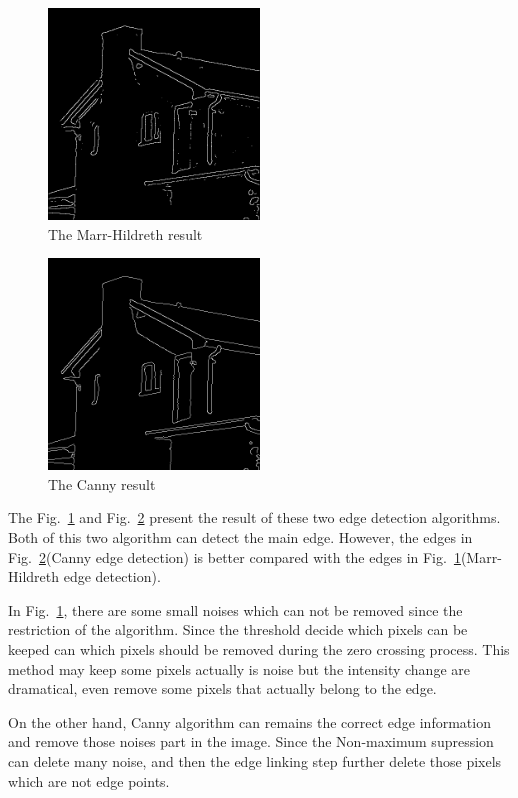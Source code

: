 \documentclass[12pt]{article}
\begin{document}
\begin{enumerate}[leftmargin=\labelsep]
\begin{enumerate}
        \begin{figure}[H]
            \centering
            \includegraphics[width=0.5\textwidth,height=0.5\textwidth]{Figure/marrHildreth.png}
            \caption{The Marr-Hildreth result}
            \label{Q4_1}
        \end{figure}
        
        \begin{figure}[H]
            \centering
            \includegraphics[width=0.5\textwidth,height=0.5\textwidth]{Figure/Canny.png}
            \caption{The Canny result}
            \label{Q4_2}
        \end{figure}

        The Fig.~\ref{Q4_1} and Fig.~\ref{Q4_2} present the result of these two edge detection algorithms. 
        Both of this two algorithm can detect the main edge.
        However, the edges in Fig.~\ref{Q4_2}(Canny edge detection) is better compared with the edges in Fig.~\ref{Q4_1}(Marr-Hildreth edge detection). 

        In Fig.~\ref{Q4_1}, there are some small noises which can not be removed since the restriction of the algorithm. 
        Since the threshold decide which pixels can be keeped can which pixels should be removed during the zero crossing process.
        This method may keep some pixels actually is noise but the intensity change are dramatical, even remove some pixels that actually belong to the edge.

        On the other hand, Canny algorithm can remains the correct edge information and remove those noises part in the image. Since the Non-maximum supression can delete many noise, and then the edge linking step further delete those pixels which are not edge points.
        

\end{enumerate}

\end{enumerate}
\end{document}

